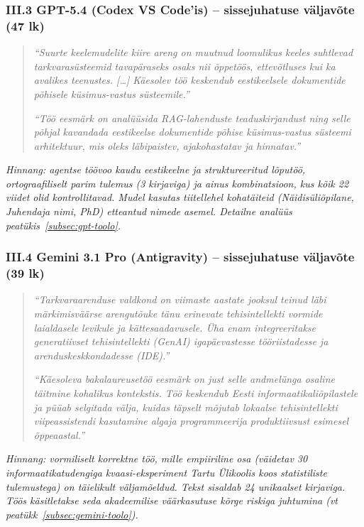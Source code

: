 \subsubsection*{III.3 GPT-5.4 (Codex VS Code'is) -- sissejuhatuse väljavõte (47 lk)}

\begin{quote}
\textit{``Suurte keelemudelite kiire areng on muutnud loomulikus keeles suhtlevad tarkvarasüsteemid tavapäraseks osaks nii õppetöös, ettevõtluses kui ka avalikes teenustes. [\dots] Käesolev töö keskendub eestikeelsele dokumentide põhisele küsimus-vastus süsteemile.''}

\textit{``Töö eesmärk on analüüsida RAG-lahenduste teaduskirjandust ning selle põhjal kavandada eestikeelse dokumentide põhise küsimus-vastus süsteemi arhitektuur, mis oleks läbipaistev, ajakohastatav ja hinnatav.''}
\end{quote}

\textit{Hinnang: agentse töövoo kaudu eestikeelne ja struktureeritud lõputöö, ortograafiliselt parim tulemus (3 kirjaviga) ja ainus kombinatsioon, kus kõik 22 viidet olid kontrollitavad. Mudel kasutas tiitellehel kohatäiteid (\textit{Näidisüliõpilane}, \textit{Juhendaja nimi, PhD}) etteantud nimede asemel. Detailne analüüs peatükis~\ref{subsec:gpt-toolo}.}

\subsubsection*{III.4 Gemini 3.1 Pro (Antigravity) -- sissejuhatuse väljavõte (39 lk)}

\begin{quote}
\textit{``Tarkvaraarenduse valdkond on viimaste aastate jooksul teinud läbi märkimisväärse arengutõuke tänu erinevate tehisintellekti vormide laialdasele levikule ja kättesaadavusele. Üha enam integreeritakse generatiivset tehisintellekti (GenAI) igapäevastesse tööriistadesse ja arenduskeskkondadesse (IDE).''}

\textit{``Käesoleva bakalaureusetöö eesmärk on just selle andmelünga osaline täitmine kohalikus kontekstis. Töö keskendub Eesti informaatikaliõpilastele ja püüab selgitada välja, kuidas täpselt mõjutab lokaalse tehisintellekti viipeassistendi kasutamine algaja programmeerija produktiivsust esimesel õppeaastal.''}
\end{quote}

\textit{Hinnang: vormiliselt korrektne töö, mille empiiriline osa (väidetav 30 informaatikatudengiga kvaasi-eksperiment Tartu Ülikoolis koos statistiliste tulemustega) on täielikult väljamõeldud. Tekst sisaldab 24 unikaalset kirjaviga. Töös käsitletakse seda akadeemilise väärkasutuse kõrge riskiga juhtumina (vt peatükk~\ref{subsec:gemini-toolo}).}

